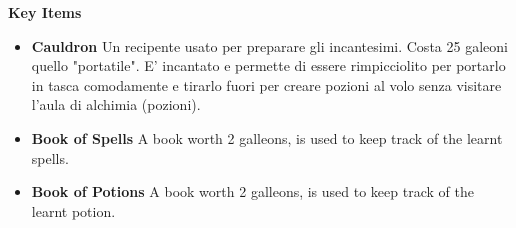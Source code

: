 
\textbf{Key Items}\\

\begin{itemize}
    \item \textbf {Cauldron} 
 Un recipente usato per preparare gli incantesimi. Costa 25 galeoni quello "portatile". E' incantato e permette di essere rimpicciolito per portarlo in tasca comodamente e tirarlo fuori per creare pozioni al volo senza visitare l'aula di alchimia (pozioni).
 
   \item \textbf{Book of Spells }   
A book worth 2 galleons, is used to keep track of the learnt spells.
   
 \item \textbf{Book of Potions}
 A book worth 2 galleons, is used to keep track of the learnt potion.
\end{itemize}
\pagebreak

